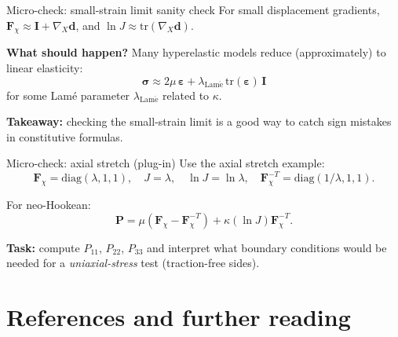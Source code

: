 \documentclass[aspectratio=169]{beamer}
\newcommand{\I}{\bm{I}}
\newcommand{\gradX}{\nabla_{\!X}}
\newcommand{\sigmaC}{\bm{\sigma}} %
\newcommand{\Fdef}{\bm{F}_{\chi}}  %
\newcommand{\Pten}{\bm{P}}         %
\begin{document}
\begin{frame}{Micro-check: small-strain limit sanity check}
\small
For small displacement gradients, \(\Fdef \approx \I + \gradX \bm{d}\), and \(\ln J \approx \mathrm{tr}(\gradX \bm{d})\).

\medskip
\textbf{What should happen?} Many hyperelastic models reduce (approximately) to linear elasticity:
\[
\sigmaC \approx 2\mu\,\bm{\varepsilon} + \lambda_{\mathrm{Lam\acute{e}}}\,\mathrm{tr}(\bm{\varepsilon})\,\I
\]
for some Lam\'e parameter \(\lambda_{\mathrm{Lam\acute{e}}}\) related to \(\kappa\).

\medskip
\textbf{Takeaway:} checking the small-strain limit is a good way to catch sign mistakes in constitutive formulas.

\end{frame}

\begin{frame}{Micro-check: axial stretch (plug-in)}
\small
Use the axial stretch example:
\[
\Fdef=\mathrm{diag}(\lambda,1,1),\quad J=\lambda,\quad \ln J=\ln\lambda,\quad \Fdef^{-T}=\mathrm{diag}(1/\lambda,1,1).
\]

\medskip
For neo-Hookean:
\[
\Pten = \mu(\Fdef-\Fdef^{-T})+\kappa(\ln J)\Fdef^{-T}.
\]

\medskip
\textbf{Task:} compute \(P_{11}\), \(P_{22}\), \(P_{33}\) and interpret what boundary conditions would be needed for a \emph{uniaxial-stress} test (traction-free sides).

\end{frame}


\section{References and further reading}
\end{document}
